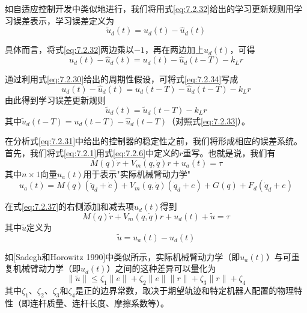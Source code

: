 \documentclass[UTF8]{ctexart}
\begin{document}
如自适应控制开发中类似地进行，我们将用式\eqref{eq:7.2.32}给出的学习更新规则用学习误差表示，学习误差定义为
\begin{equation}\label{eq:7.2.33}
\tilde{u}_d(t) = u_d(t) - \hat{u}_d(t)
\end{equation}

具体而言，将式\eqref{eq:7.2.32}两边乘以$-1$，再在两边加上$u_d(t)$，可得
\begin{equation}\label{eq:7.2.34}
u_d(t) - \hat{u}_d(t) = u_d(t) - \hat{u}_d(t-T) - k_L r
\end{equation}

通过利用式\eqref{eq:7.2.30}给出的周期性假设，可将式\eqref{eq:7.2.34}写成
\begin{equation}\label{eq:7.2.35}
u_d(t) - \hat{u}_d(t) = u_d(t-T) - \hat{u}_d(t-T) - k_L r
\end{equation}
由此得到学习误差更新规则
\begin{equation}\label{eq:7.2.36}
\tilde{u}_d(t) = \tilde{u}_d(t-T) - k_L r
\end{equation}
其中$\tilde{u}_d(t-T)=u_d(t-T)-\hat{u}_d(t-T)$（对照式\eqref{eq:7.2.33}）。

在分析式\eqref{eq:7.2.31}中给出的控制器的稳定性之前，我们将形成相应的误差系统。首先，我们将式\eqref{eq:7.2.1}用式\eqref{eq:7.2.6}中定义的$r$重写。也就是说，我们有
\begin{equation}\label{eq:7.2.37}
M(q)\dot{r} + V_m(q,\dot{q})r + u_a(t) = \tau
\end{equation}
其中$n \times 1$向量$u_a(t)$用于表示"实际机械臂动力学"
\begin{equation}\label{eq:7.2.38}
u_a(t) = M(q)(\ddot{q}_d + \dot{e}) + V_m(q,\dot{q})(\dot{q}_d + e) + G(q) + F_d(\dot{q}_d + e)
\end{equation}

在式\eqref{eq:7.2.37}的右侧添加和减去项$u_d(t)$得到
\begin{equation}\label{eq:7.2.39}
M(q)\dot{r} + V_m(q,\dot{q})r + u_d(t) + \tilde{u} = \tau
\end{equation}
其中$\tilde{u}$定义为
\begin{equation}\label{eq:7.2.40}
\tilde{u} = u_a(t) - u_d(t)
\end{equation}

如[Sadegh和Horowitz 1990]中类似所示，实际机械臂动力学（即$u_a(t)$）与可重复机械臂动力学（即$u_d(t)$）之间的这种差异可以量化为
\begin{equation}\label{eq:7.2.41}
\|\tilde{u}\| \leq \zeta_1\|e\| + \zeta_2\|e\|\|r\| + \zeta_3\|r\| + \zeta_4
\end{equation}
其中$\zeta_1$、$\zeta_2$、$\zeta_3$和$\zeta_4$是正的边界常数，取决于期望轨迹和特定机器人配置的物理特性（即连杆质量、连杆长度、摩擦系数等）。
\end{document}
